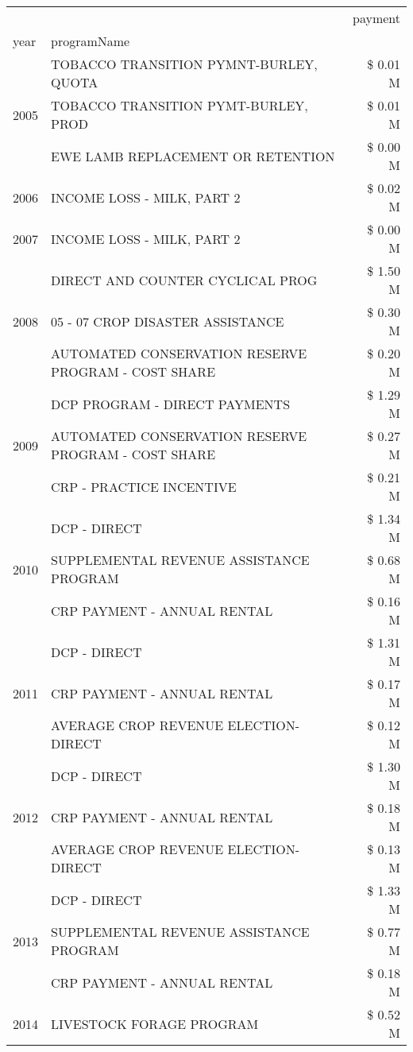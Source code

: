 \begin{tabular}{llr}
\toprule
 &  & payment \\
year & programName &  \\
\midrule
\multirow[t]{3}{*}{2005} & TOBACCO TRANSITION PYMNT-BURLEY, QUOTA & \$ 0.01 M \\
 & TOBACCO TRANSITION PYMT-BURLEY, PROD & \$ 0.01 M \\
 & EWE LAMB REPLACEMENT OR RETENTION & \$ 0.00 M \\
\cline{1-3}
2006 & INCOME LOSS - MILK, PART 2 & \$ 0.02 M \\
\cline{1-3}
2007 & INCOME LOSS - MILK, PART 2 & \$ 0.00 M \\
\cline{1-3}
\multirow[t]{3}{*}{2008} & DIRECT AND COUNTER CYCLICAL PROG & \$ 1.50 M \\
 & 05 - 07 CROP DISASTER ASSISTANCE & \$ 0.30 M \\
 & AUTOMATED CONSERVATION RESERVE PROGRAM - COST SHARE & \$ 0.20 M \\
\cline{1-3}
\multirow[t]{3}{*}{2009} & DCP PROGRAM - DIRECT PAYMENTS & \$ 1.29 M \\
 & AUTOMATED CONSERVATION RESERVE PROGRAM - COST SHARE & \$ 0.27 M \\
 & CRP - PRACTICE INCENTIVE & \$ 0.21 M \\
\cline{1-3}
\multirow[t]{3}{*}{2010} & DCP - DIRECT & \$ 1.34 M \\
 & SUPPLEMENTAL REVENUE ASSISTANCE PROGRAM & \$ 0.68 M \\
 & CRP PAYMENT - ANNUAL RENTAL & \$ 0.16 M \\
\cline{1-3}
\multirow[t]{3}{*}{2011} & DCP - DIRECT & \$ 1.31 M \\
 & CRP PAYMENT - ANNUAL RENTAL & \$ 0.17 M \\
 & AVERAGE CROP REVENUE ELECTION-DIRECT & \$ 0.12 M \\
\cline{1-3}
\multirow[t]{3}{*}{2012} & DCP - DIRECT & \$ 1.30 M \\
 & CRP PAYMENT - ANNUAL RENTAL & \$ 0.18 M \\
 & AVERAGE CROP REVENUE ELECTION-DIRECT & \$ 0.13 M \\
\cline{1-3}
\multirow[t]{3}{*}{2013} & DCP - DIRECT & \$ 1.33 M \\
 & SUPPLEMENTAL REVENUE ASSISTANCE PROGRAM & \$ 0.77 M \\
 & CRP PAYMENT - ANNUAL RENTAL & \$ 0.18 M \\
\cline{1-3}
\multirow[t]{3}{*}{2014} & LIVESTOCK FORAGE PROGRAM & \$ 0.52 M \\

\end{tabular}
